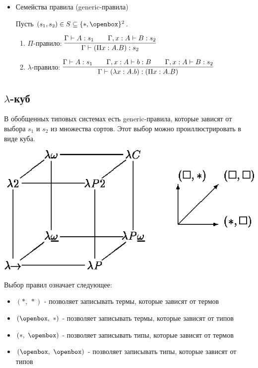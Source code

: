 \documentclass[12pt]{article}
\begin{document}
\begin{itemize}
\item Семейства правила (generic-правила)

Пусть $(s_1, s_2) \in S \subseteq \{*, \openbox\}^2$.

\begin{enumerate}
    \item $\Pi$-правило: $\vcenter{\infer[]{\Gamma \vdash (\Pi x : A.B) : s_2}{\Gamma \vdash A : s_1 \qquad \Gamma, x : A \vdash B : s_2}}$
    \item $\lambda$-правило: $\vcenter{\infer[]{\Gamma \vdash (\lambda x : A . b) : (\Pi x : A. B)}{\Gamma \vdash A:s_1 \qquad \Gamma, x : A \vdash b : B \qquad \Gamma, x : A \vdash B : s_2}}$
\end{enumerate}

\end{itemize}

\subsection{$\lambda$-куб}

В обобщенных типовых системах есть generic-правила, которые зависят от выбора $s_1$ и $s_2$ из множества сортов. Этот выбор можно проиллюстрировать в виде куба.

\begin{center}
    {\includegraphics[scale=0.5]{pic.png}}
\end{center}

Выбор правил означает следующее:
\begin{itemize}
    \item $(*,\ *)$ - позволяет записывать термы, которые зависят от термов
    \item $(\openbox,\ *)$ - позволяет записывать термы, которые зависят от типов
    \item $(*,\ \openbox)$ - позволяет записывать типы, которые зависят от термов
    \item $(\openbox,\ \openbox)$ - позволяет записывать типы, которые зависят от типов
\end{itemize}
\end{document}
